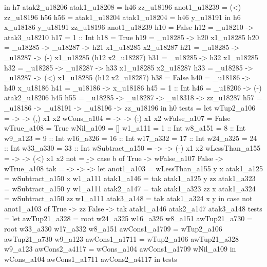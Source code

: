                                                                                                                       in h7 atak2_u18206
                                                        atak1_u18208 = h46 zz_u18196
                                                        anot1_u18239 = (<) zz_u18196 h56
                                                        h56 = atak1_u18204
                                                        atak1_u18204 = h46 y_u18191
                                                      in h6 x_u18186 y_u18191 zz_u18196 anot1_u18239
         h10 = False
         h12 = _u18210 -> atak3_u18210
         h17 = 1 :: Int
         h18 = True
         h19 = _u18285 -> h20 x1_u18285
         h20 = _u18285 -> _u18287 -> h21 x1_u18285 x2_u18287
         h21 = _u18285 -> _u18287 -> (-) x1_u18285 (h12 x2_u18287)
         h31 = _u18285 -> h32 x1_u18285
         h32 = _u18285 -> _u18287 -> h33 x1_u18285 x2_u18287
         h33 = _u18285 -> _u18287 -> (<) x1_u18285 (h12 x2_u18287)
         h38 = False
         h40 = \x_u18186 -> h40 x_u18186
         h41 = \x_u18186 -> x_u18186
         h45 = 1 :: Int
         h46 = _u18206 -> (-) atak2_u18206 h45
         h55 = \y_u18285 -> \zz_u18287 -> \x_u18318 -> zz_u18287
         h57 = \x_u18186 -> \y_u18191 -> \zz_u18196 -> zz_u18196
       in h0
tests = let
          wTup2_a106 =  ->  -> (,) x1 x2
          wCons_a104 =  ->  -> (:) x1 x2
          wFalse_a107 = False
          wTrue_a108 = True
          wNil_a109 = []
          w1_a111 = 1 :: Int
          w8_a151 = 8 :: Int
          w9_a123 = 9 :: Int
          w16_a326 = 16 :: Int
          w17_a332 = 17 :: Int
          w24_a325 = 24 :: Int
          w33_a330 = 33 :: Int
          wSubtract_a150 =  ->  -> (-) x1 x2
          wLessThan_a155 =  ->  -> (<) x1 x2
          not = \b -> case b of
                        True -> wFalse_a107
                        False -> wTrue_a108
          tak = \x -> \y -> \zz -> let
                                     anot1_a103 = wLessThan_a155 y x
                                     atak1_a125 = wSubtract_a150 x w1_a111
                                     atak1_a146 = tak atak1_a125 y zz
                                     atak1_a323 = wSubtract_a150 y w1_a111
                                     atak2_a147 = tak atak1_a323 zz x
                                     atak1_a324 = wSubtract_a150 zz w1_a111
                                     atak3_a148 = tak atak1_a324 x y
                                   in case not anot1_a103 of
                                        True -> zz
                                        False -> tak atak1_a146 atak2_a147 atak3_a148
          tests = let
                    awTup21_a328 = root w24_a325 w16_a326 w8_a151
                    awTup21_a730 = root w33_a330 w17_a332 w8_a151
                    awCons1_a1709 = wTup2_a106 awTup21_a730 w9_a123
                    awCons1_a1711 = wTup2_a106 awTup21_a328 w9_a123
                    awCons2_a4117 = wCons_a104 awCons1_a1709 wNil_a109
                  in wCons_a104 awCons1_a1711 awCons2_a4117
        in tests

